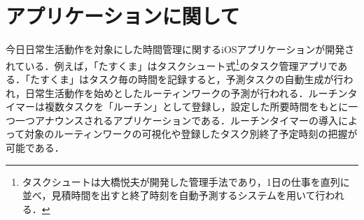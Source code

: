 \section{アプリケーションに関して}
今日日常生活動作を対象にした時間管理に関するiOSアプリケーションが開発されている．例えば，「たすくま」はタスクシュート式\footnote{タスクシュートは大橋悦夫が開発した管理手法であり，1日の仕事を直列に並べ，見積時間を出すと終了時刻を自動予測するシステムを用いて行われる．}のタスク管理アプリである\cite{Taskuma}．「たすくま」はタスク毎の時間を記録すると，予測タスクの自動生成が行われ，日常生活動作を始めとしたルーティンワークの予測が行われる．ルーチンタイマーは複数タスクを「ルーチン」として登録し，設定した所要時間をもとに一つ一つアナウンスされるアプリケーションである\cite{RoutineTimer}．ルーチンタイマーの導入によって対象のルーティンワークの可視化や登録したタスク別終了予定時刻の把握が可能である．

